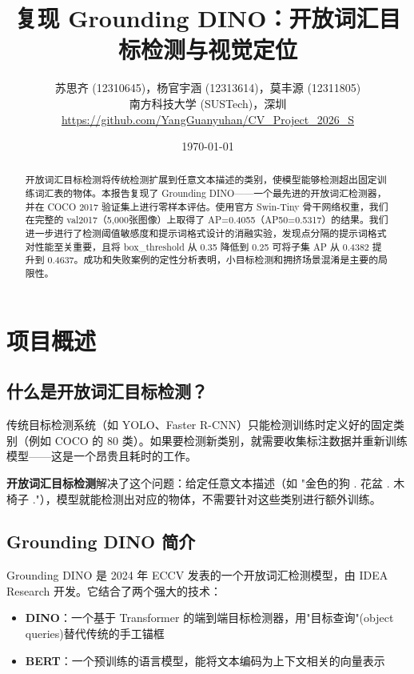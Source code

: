\documentclass[12pt,a4paper]{ctexart}
\title{\heiti 复现 Grounding DINO：开放词汇目标检测与视觉定位}
\author{
    苏思齐 (12310645)，杨官宇涵 (12313614)，莫丰源 (12311805)\\
    南方科技大学 (SUSTech)，深圳\\[4pt]
    {\small\url{https://github.com/YangGuanyuhan/CV\_Project\_2026\_S}}
}
\date{\today}
\begin{document}
\maketitle

\begin{abstract}
开放词汇目标检测将传统检测扩展到任意文本描述的类别，使模型能够检测超出固定训练词汇表的物体。本报告复现了 Grounding DINO——一个最先进的开放词汇检测器，并在 COCO 2017 验证集上进行零样本评估。使用官方 Swin-Tiny 骨干网络权重，我们在完整的 val2017（5,000张图像）上取得了 AP=0.4055（AP50=0.5317）的结果。我们进一步进行了检测阈值敏感度和提示词格式设计的消融实验，发现点分隔的提示词格式对性能至关重要，且将 box\_threshold 从 0.35 降低到 0.25 可将子集 AP 从 0.4382 提升到 0.4637。成功和失败案例的定性分析表明，小目标检测和拥挤场景混淆是主要的局限性。
\end{abstract}

\section{项目概述}

\subsection{什么是开放词汇目标检测？}

传统目标检测系统（如 YOLO、Faster R-CNN）只能检测训练时定义好的固定类别（例如 COCO 的 80 类）。如果要检测新类别，就需要收集标注数据并重新训练模型——这是一个昂贵且耗时的工作。

\textbf{开放词汇目标检测}解决了这个问题：给定任意文本描述（如 "金色的狗 . 花盆 . 木椅子 ."），模型就能检测出对应的物体，不需要针对这些类别进行额外训练。

\subsection{Grounding DINO 简介}

Grounding DINO 是 2024 年 ECCV 发表的一个开放词汇检测模型，由 IDEA Research 开发。它结合了两个强大的技术：

\begin{itemize}
    \item \textbf{DINO}：一个基于 Transformer 的端到端目标检测器，用"目标查询"(object queries)替代传统的手工锚框
    \item \textbf{BERT}：一个预训练的语言模型，能将文本编码为上下文相关的向量表示
\end{itemize}
\end{document}
